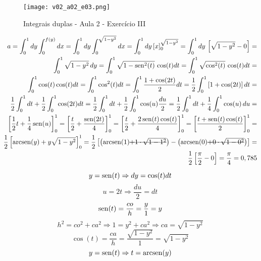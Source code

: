 \begin{enumerate}
	\begin{figure}[htb]
		\caption{Integrais duplas - Aula 2 - Exercício III}
		\label{v02_a02_e03}
		\centering
		\texttt{[image: v02\_a02\_e03.png]}		
	\end{figure}
	
	\begin{align*}
		a = \int_0^1 dy \int_0^{f(y)} dx = \int_0^1 dy \int_0^{\sqrt{1 - y^2}} dx = \int_0^1 dy\, [x]_0^{\sqrt{1 - y^2}} = \int_0^1 dy\, \left[\sqrt{1 - y^2} - 0\right] =\\ \int_0^1 \sqrt{1 - y^2}\, dy = \int_0^1 \sqrt{1 - \sen^2(t)}\, \cos(t) dt = \int_0^1 \sqrt{\cos^2(t)}\, \cos(t) dt =\\ \int_0^1 \cos(t)\cos(t) dt = \int_0^1 \cos^2(t) dt = \int_0^1 \dfrac{1 + \cos(2t)}{2} dt = \dfrac{1}{2}\int_0^1 \left[1 + \cos(2t)\right] dt =\\ \dfrac{1}{2}\int_0^1 dt + \dfrac{1}{2}\int_0^1 \cos(2t) dt = \dfrac{1}{2}\int_0^1 dt + \dfrac{1}{2}\int_0^1 \cos(u) \dfrac{du}{2} = \dfrac{1}{2}\int_0^1 dt + \dfrac{1}{4}\int_0^1 \cos(u)\, du =\\ \left[\dfrac{1}{2}t + \dfrac{1}{4}\sen(u)\right]_0^1 = \left[\dfrac{t}{2} + \dfrac{\sen(2t)}{4}\right]_0^1 = \left[\dfrac{t}{2} + \dfrac{2\sen(t)\cos(t)}{4}\right]_0^1 = \left[\dfrac{t + \sen(t)\cos(t)}{2}\right]_0^1 =\\ \dfrac{1}{2}\left[\arcsen(y) + y\sqrt{1 - y^2}\right]_0^1 = \dfrac{1}{2}\left[\left(\arcsen(1) \overstrike{+ 1 \cdot\sqrt{1 - 1^2}}\right) - \left(\arcsen(0) \overstrike{+ 0 \cdot \sqrt{1 - 0^2}}\right)\right] =\\ \dfrac{1}{2}\left[\dfrac{\pi}{2} - 0\right] = \dfrac{\pi}{4} = 0,785
	\end{align*}
		
	\begin{equation*}
		y = \operatorname{sen}(t) \Rightarrow dy = \cos(t) dt
	\end{equation*}	
	\begin{equation*}
		u = 2t \Rightarrow \dfrac{du}{2} = dt
	\end{equation*}
	\begin{equation*}
		\operatorname{sen}(t) = \dfrac{co}{h} = \dfrac{y}{1} = y
	\end{equation*}
	\begin{equation*}
		h^2 = co^2 + ca^2 \Rightarrow 1 = y^2 + ca^2 \Rightarrow ca = \sqrt{1 - y^2}
	\end{equation*}
	\begin{equation*}
		\cos(t) = \dfrac{ca}{h} = \dfrac{\sqrt{1 - y^2}}{1} = \sqrt{1 - y^2}
	\end{equation*}
	\begin{equation*}
		y = \operatorname{sen}(t) \Rightarrow t = \operatorname{arcsen}(y)
	\end{equation*}
			

\end{enumerate}
